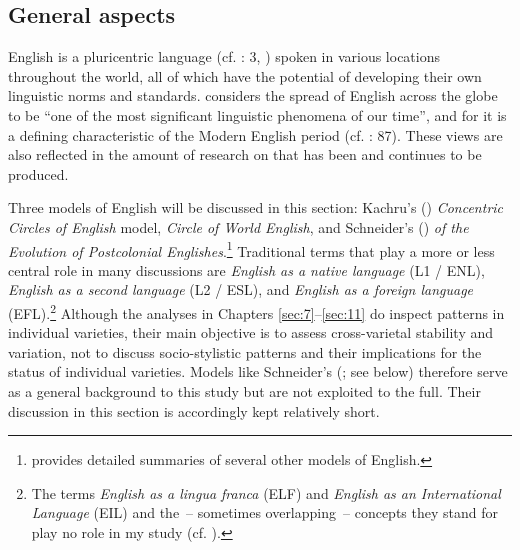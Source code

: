 \subsection{\label{bkm:Ref497158198}General aspects}\label{sec:4.3.1}

English is a pluricentric language (cf. \citealt{Kachru1988}: 3, \citealt{Clyne1992,Leitner1992}) spoken in various locations throughout the world, all of which have the potential of developing their own linguistic norms and standards. \citet[vii]{Ferguson1982} considers the spread of English across the globe to be “one of the most significant linguistic phenomena of our time”, and for   \citet[12–17]{MesthrieBhatt2008} it is a defining characteristic of the Modern English period (cf. \citealt{McArthur1998}: 87). These views are also reflected in the amount of research on  that has been and continues to be produced.

  Three models of English will be discussed in this section: Kachru’s (\citeyear{Kachru1985, Kachru1988}) \textit{Concentric Circles of English} model,  \textit{Circle of World English}, and Schneider’s (\citeyear{Schneider2003, Schneider2007}) \textit{ of the Evolution of Postcolonial Englishes}.\footnote{\citet[2–56]{Jenkins2015} provides detailed summaries of several other models of English.} Traditional terms that play a more or less central role in many discussions are \textit{English as a native language} (L1 / ENL), \textit{English as a second language} (L2 / ESL), and \textit{English as a foreign language} (EFL).\footnote{The terms \textit{English as a lingua franca} (ELF) and \textit{English as an International Language} (EIL) and the~– sometimes overlapping~– concepts they stand for play no role in my study (cf. \citealt{Pennycook1994,Modiano1999,Jenkins2000,Jenkins2007,Seidlhofer2011}).} Although the analyses in Chapters \ref{sec:7}–\ref{sec:11} do inspect patterns in individual varieties, their main objective is to assess cross-varietal stability and variation, not to discuss socio-stylistic patterns and their implications for the status of individual varieties. Models like Schneider’s (\citeyear{Schneider2003,Schneider2007}; see below) therefore serve as a general background to this study but are not exploited to the full. Their discussion in this section is accordingly kept relatively short.

